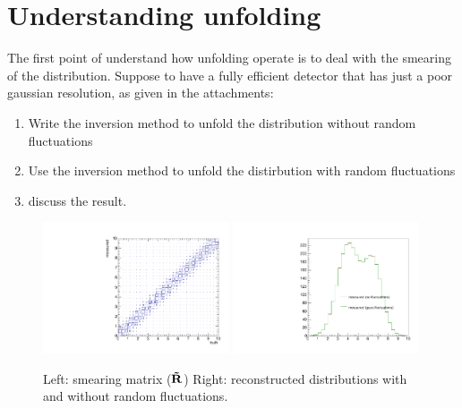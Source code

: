 \documentclass[a4paper,11pt]{article}
\newcommand{\respt}{\ensuremath \mathbf{\tilde{R}}}
\begin{document}
\section{Understanding unfolding}
The first point of understand how unfolding operate is to deal with the smearing of the distribution.
Suppose to have a fully efficient detector that has just a poor gaussian resolution, as given in the attachments:
\begin{enumerate}
	\item Write the inversion method to unfold the distribution without random fluctuations
	\item Use the inversion method to unfold the distirbution with random fluctuations
	\item discuss the result.
\end{enumerate}
\begin{figure}[Hh!]
	\includegraphics[width=0.49\textwidth]{figs/respt.pdf}
	\includegraphics[width=0.49\textwidth]{figs/reco.pdf}
	\caption{
		\label{fig:exe1}
		Left: smearing matrix ($\respt$) 
		Right: reconstructed distributions with and without random fluctuations.
	}	
\end{figure}
\FloatBarrier


\FloatBarrier
\nocite{*}
%


\cleardoublepage
\end{document}
